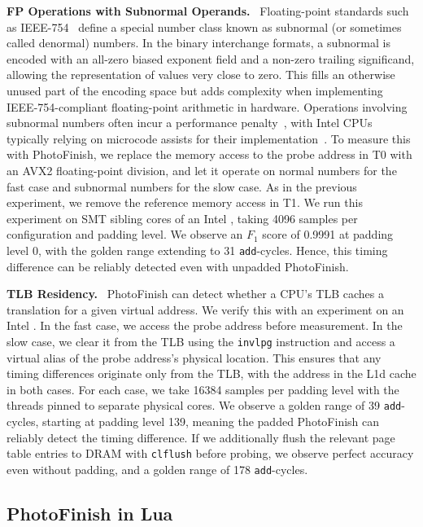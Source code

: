 \documentclass[letterpaper,twocolumn,10pt]{article} %
\newcommand{\paragrabf}[1]{\noindent \textbf{#1.}\ }
\newcommand{\AttackName}{PhotoFinish\xspace}
\newcommand{\tprobe}{{\fontfamily{cmtt}\selectfont T0}\xspace}
\newcommand{\tref}{{\fontfamily{cmtt}\selectfont T1}\xspace}
\begin{document}
\paragrabf{FP Operations with Subnormal Operands}
Floating-point standards such as IEEE-754~\cite{ieee7542008} define a special number class known as subnormal (or sometimes called denormal) numbers.
In the binary interchange formats, a subnormal is encoded with an all-zero biased exponent field and a non-zero trailing significand, allowing the representation of values very close to zero.
This fills an otherwise unused part of the encoding space but adds complexity when implementing IEEE-754-compliant floating-point arithmetic in hardware.
Operations involving subnormal numbers often incur a performance penalty~\cite{Andrysco2015subnormal,kohlbrenner2017effectiveness}, with Intel CPUs typically relying on microcode assists for their implementation~\cite{Intel2023optimization}.
To measure this with \AttackName, we replace the memory access to the probe address in \tprobe with an AVX2 floating-point division, and let it operate on normal numbers for the fast case and subnormal numbers for the slow case.
As in the previous experiment, we remove the reference memory access in \tref.
We run this experiment on SMT sibling cores of an Intel \labeightynineCPU, taking \num{4096} samples per configuration and padding level.
We observe an $F_1$ score of \num{0.9991} at padding level $0$, with the golden range extending to \num{31} \texttt{add}-cycles.
Hence, this timing difference can be reliably detected even with unpadded \AttackName.

\paragrabf{TLB Residency}
\AttackName can detect whether a CPU's TLB caches a translation for a given virtual address.
We verify this with an experiment on an Intel \labfourtytwoCPU.
In the fast case, we access the probe address before measurement.
In the slow case, we clear it from the TLB using the \texttt{invlpg} instruction and access a virtual alias of the probe address's physical location.
This ensures that any timing differences originate only from the TLB, with the address in the L1d cache in both cases.
For each case, we take \num{16384} samples per padding level with the threads pinned to separate physical cores.
We observe a golden range of \num{39} \texttt{add}-cycles, starting at padding level \num{139}, meaning the padded \AttackName can reliably detect the timing difference.
If we additionally flush the relevant page table entries to DRAM with \texttt{clflush} before probing, we observe perfect accuracy even without padding, and a golden range of \num{178} \texttt{add}-cycles.

\subsection{\AttackName in Lua}\label{subsec:attackname-in-lua}
\end{document}
